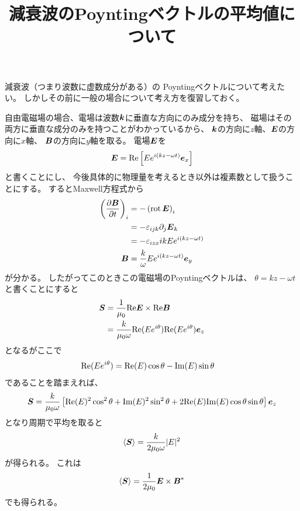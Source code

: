 \documentclass[a4paper, 12pt]{jsarticle}
\title{減衰波のPoyntingベクトルの平均値について}
\theoremstyle{definition}
\def\vec#1{\mbox{\boldmath $#1$}}
\renewcommand{\Re}{{\rm Re}}
\renewcommand{\Im}{{\rm Im}}
\newcommand{\pdif}[2]{\frac{\partial #1}{\partial #2}}
\DeclareMathOperator{\Rot}{rot}
\begin{document}
\maketitle

減衰波（つまり波数に虚数成分がある）の
Poyntingベクトルについて考えたい。
しかしその前に一般の場合について考え方を復習しておく。

自由電磁場の場合、電場は波数$\vec{k}$に垂直な方向にのみ成分を持ち、
磁場はその両方に垂直な成分のみを持つことがわかっているから、
$\vec{k}$の方向に$z$軸、$\vec{E}$の方向に$x$軸、
$\vec{B}$の方向に$y$軸を取る。
電場$\vec{E}$を
\begin{align}
	\vec{E} = \Re\left[ E e^{i(kz - \omega t )} \vec{e}_x \right]
\end{align}
と書くことにし、
今後具体的に物理量を考えるとき以外は複素数として扱うことにする。
するとMaxwell方程式から
\begin{align}
	\left( \pdif{\vec{B}}{t} \right)_i
	&= -\left( \Rot \vec{E} \right)_i \\
	&= -\varepsilon_{ijk} \partial_j \vec{E}_k \\
	&= -\varepsilon_{izx} ik E e^{i(kz - \omega t)} \\
	\vec{B} &= \frac{k}{\omega} E e^{i(kz - \omega t)} \vec{e}_y
\end{align}
が分かる。
したがってこのときこの電磁場のPoyntingベクトルは、
$\theta = kz - \omega t$と書くことにすると
\begin{align}
	\vec{S} &= \frac{1}{\mu_0}\Re \vec{E} \times \Re \vec{B} \\
	&= \frac{k}{\mu_0 \omega} \Re(E e^{i\theta})
	\Re(E e^{i\theta}) \vec{e}_z
\end{align}
となるがここで
\begin{align}
	\Re(E e^{i\theta}) &= \Re(E) \cos\theta - \Im(E) \sin\theta
\end{align}
であることを踏まえれば、
\begin{align}
	\vec{S} = \frac{k}{\mu_0 \omega} \left[
		\Re(E)^2 \cos^2 \theta + \Im(E)^2 \sin^2 \theta
		+ 2 \Re(E) \Im(E) \cos \theta \sin \theta
	\right] \vec{e}_z
\end{align}
となり周期で平均を取ると
\begin{align}
	\left< \vec{S} \right> = \frac{k}{2 \mu_0 \omega} |E|^2
\end{align}
が得られる。
これは
\begin{align}
	\left< \vec{S} \right>
	= \frac{1}{2\mu_0} \vec{E} \times \vec{B}^*
\end{align}
でも得られる。
\end{document}
